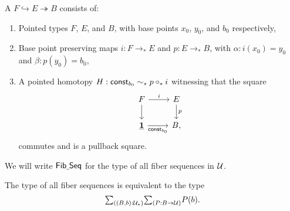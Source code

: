 \begin{defn}
A  $F\hookrightarrow E \twoheadrightarrow B$ consists of:
\begin{enumerate}
\item Pointed types $F$, $E$, and $B$, with base points $x_0$, $y_0$, and $b_0$ respectively, 
\item Base point preserving maps $i:F\to_\ast E$ and $p:E\to_\ast B$, with $\alpha:i(x_0)=y_0$ and $\beta:p(y_0)=b_0$,
\item A pointed homotopy $H:\mathsf{const}_{b_0}\sim_\ast p\circ_\ast i$ witnessing that the square
\begin{equation*}
\begin{tikzcd}
F \arrow[r,"i"] \arrow[d] & E \arrow[d,"p"] \\
\unit \arrow[r,swap,"\const_{b_0}"] & B,
\end{tikzcd}
\end{equation*}
commutes and is a pullback square.
\end{enumerate}
We will write $\mathsf{Fib\underline{\ }{}Seq}$ for the type of all fiber sequences in $\mathcal{U}$.
\end{defn}

\begin{prp}
The type of all fiber sequences is equivalent to the type
\begin{equation*}
\sm{(B,b):\UU_\ast}{P:B\to\UU}P(b).
\end{equation*}
\end{prp}
